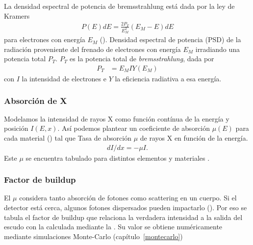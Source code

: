 La densidad espectral de potencia de bremsstrahlung está dada por la ley de
Kramers\cite{kramers_xciii._1923}
\begin{align}
    P(E)dE = \frac{2P_T}{E_M^2}(E_M-E)dE
    \label{eq:kramers}
\end{align} para electrones con energía $E_M$ ().
{Densidad espectral de potencia (PSD) de la radiación proveniente del 
frenado de electrones con energía $E_M$ irradiando una potencia total $P_T$.}
$P_T$ es la potencia total de \emph{bremsstrahlung}, dada por
\begin{align*}
    P_T&=E_MIY(E_M)
\end{align*}con $I$ la intensidad de electrones e $Y$ la eficiencia radiativa a
esa energía.
\subsubsection{Absorción de X}
Modelamos la intensidad de rayos X como función contínua de la energía y
posición $I(E,x)$.
Así podemos plantear un coeficiente de absorción $\mu(E)$ para cada 
material () tal que 
{Tasa de absorción $\mu$ de rayos X en función de la energía\cite{xraycoef}.}
\begin{align}
    \label{eq:absorcionx}
    dI/dx=-\mu I.
\end{align}
Este $\mu$ se encuentra tabulado para distintos elementos y materiales
\cite{xraycoef}.
\subsubsection{Factor de buildup}
El $\mu$ considera tanto absorción de fotones como scattering en un cuerpo.
Si el detector está cerca, algunos fotones dispersados pueden
impactarlo ().
Por eso se tabula el factor de buildup
que relaciona la verdadera intensidad a la salida del escudo 
con la calculada mediante la .
Su valor se obtiene numéricamente mediante simulaciones Monte-Carlo
(capítulo~\ref{montecarlo})
